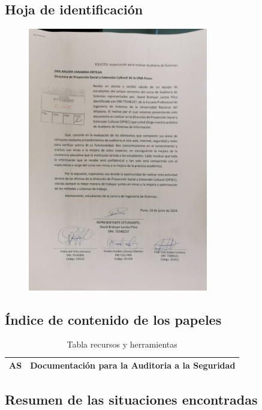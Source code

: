 \documentclass[12pt,a4paper]{article}
\begin{document}
\subsection{Hoja de identificación}
\begin{figure}[!htb]
    \centering
    \includegraphics[width=0.7\textwidth]{images/solicitud.jpeg}
    
\end{figure} 
\FloatBarrier 
\subsection{Índice de contenido de los papeles}
\begin{table}[ht]
    \centering
    \begin{tabular}{|c|c|}
        \toprule
        \textbf{AS} & \textbf{Documentación para la Auditoria a la Seguridad} \\
        \bottomrule
    \end{tabular}
    \caption{Tabla recursos y herramientas}
    
\end{table}


\subsection{Resumen de las situaciones encontradas}
\end{document}
